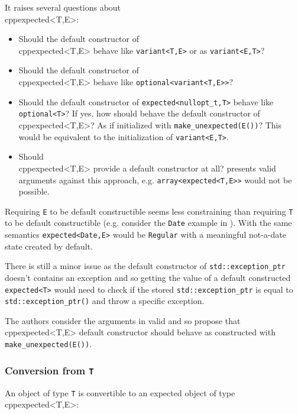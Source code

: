 \documentclass[a4paper,10pt]{article}
\newcommand{\cpp}[1]{\lstinline{#1}}
\begin{document}
\noindent
It raises several questions about \\cpp{expected<T,E>}:

\begin{itemize}
\item Should the default constructor of \\cpp{expected<T,E>} behave like \cpp{variant<T,E>} or as \cpp{variant<E,T>}?
\item Should the default constructor of \\cpp{expected<T,E>} behave like \cpp{optional<variant<T,E>>}?
\item Should the default constructor of \cpp{expected<nullopt_t,T>} behave like \cpp{optional<T>}? If yes, how should behave the default constructor of \\cpp{expected<T,E>}? As if initialized with \cpp{make_unexpected(E())}? This would be equivalent to the initialization of \cpp{variant<E,T>}.
\item Should \\cpp{expected<T,E>} provide a default constructor at all? \cite{OptionalRev3} presents valid arguments against this approach, e.g. \cpp{array<expected<T,E>>} would not be possible. 
\end{itemize}

Requiring \cpp{E} to be default constructible seems less constraining than requiring \cpp{T} to be default constructible (e.g. consider the \cpp{Date} example in \cite{OptionalRev3}). With the same semantics \cpp{expected<Date,E>} would be \cpp{Regular} with a meaningful not-a-date state created by default.

There is still a minor issue as the default constructor of \cpp{std::exception_ptr} doesn't contains an exception and so getting the value of a default constructed \cpp{expected<T>} would need to check if the stored \cpp{std::exception_ptr} is equal to \cpp{std::exception_ptr()} and throw a specific exception.

The authors consider the arguments in  \cite{OptionalRev3} valid and so propose that \\cpp{expected<T,E>} default constructor should behave as constructed with \cpp{make_unexpected(E())}.

\subsubsection{Conversion from \cpp{T}}

An object of type \cpp{T} is convertible to an expected object of type \\cpp{expected<T,E>}:
\end{document}
